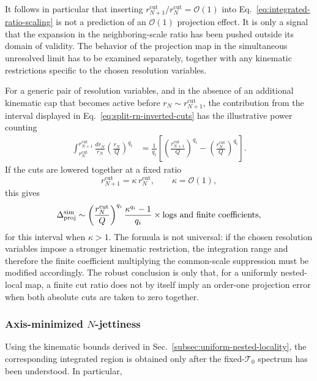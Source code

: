 \documentclass[11pt]{article}
\newcommand{\rn}{r_N}
\newcommand{\rnp}{r_{N+1}}
\newcommand{\cut}{\mathrm{cut}}
\begin{document}
It follows in particular that inserting \(\rnp^{\cut}/\rn^{\cut}=\mathcal O(1)\) into
Eq.~\eqref{eq:integrated-ratio-scaling} is not a prediction of an \(\mathcal O(1)\) projection effect. It is
only a signal that the expansion in the neighboring-scale ratio has been pushed outside its domain of
validity. The behavior of the projection map in the simultaneous unresolved limit has to be examined
separately, together with any kinematic restrictions specific to the chosen resolution variables.

For a generic pair of resolution variables, and in the absence of an additional kinematic cap that becomes
active before \(\rn\sim\rnp^{\cut}\), the contribution from the interval displayed in
Eq.~\eqref{eq:split-rn-inverted-cuts} has the illustrative power counting
\begin{align}
\int_{\rn^{\cut}}^{\rnp^{\cut}}
\frac{d\rn}{\rn}
\left(\frac{\rn}{Q}\right)^{q_i}
&=
\frac{1}{q_i}
\left[
\left(\frac{\rnp^{\cut}}{Q}\right)^{q_i}
-
\left(\frac{\rn^{\cut}}{Q}\right)^{q_i}
\right].
\label{eq:uniform-nested-integrated-region}
\end{align}
If the cuts are lowered together at a fixed ratio
\begin{equation}
\rnp^{\cut}=\kappa\,\rn^{\cut},
\qquad \kappa=\mathcal O(1),
\label{eq:fixed-kappa-cuts}
\end{equation}
this gives
\begin{equation}
\Delta_{\rm proj}^{\rm sim}
\sim
\left(\frac{\rn^{\cut}}{Q}\right)^{q_i}
\frac{\kappa^{q_i}-1}{q_i}
\times\text{logs and finite coefficients},
\label{eq:fixed-kappa-uniform-nested-scaling}
\end{equation}
for this interval when \(\kappa>1\). The formula is not universal: if the chosen resolution variables impose
a stronger kinematic restriction, the integration range and therefore the finite coefficient multiplying the
common-scale suppression must be modified accordingly. The robust conclusion is only that, for a uniformly
nested-local map, a finite cut ratio does not by itself imply an order-one projection error when both absolute
cuts are taken to zero together.

\subsubsection{Axis-minimized $N$-jettiness}

Using the kinematic bounds derived in Sec.~\ref{subsec:uniform-nested-locality}, the corresponding integrated
region is obtained only after the fixed-$\mathcal T_0$ spectrum has been understood. In particular,
\end{document}
